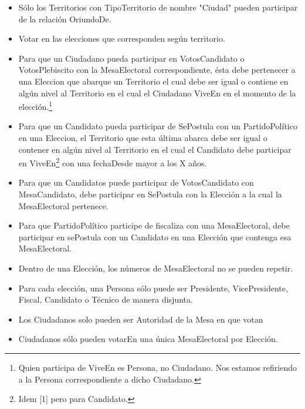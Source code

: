\begin{itemize}
\item{Sólo los Territorios con TipoTerritorio de nombre "Ciudad" pueden participar de la relación OriundoDe.}
\item{Votar en las elecciones que corresponden según territorio.}

\item{Para que un Ciudadano pueda participar en VotosCandidato o VotosPlebiscito con la MesaElectoral correspondiente, ésta debe pertenecer a una Eleccion que abarque un Territorio el cual debe ser igual o contiene en algún nivel al Territorio en el cual el Ciudadano ViveEn en el momento de la elección.\footnote{Quien participa de ViveEn es Persona, no Ciudadano. Nos estamos refiriendo a la Persona correspondiente a dicho Ciudadano.}
}


\item{Para que un Candidato pueda participar de SePostula con un PartidoPolítico en una Eleccion, el Territorio que esta última abarca debe ser igual o contener en algún nivel al Territorio en el cual el Candidato debe participar en ViveEn\footnote{Idem [1] pero para Candidato.} con una fechaDesde mayor a los X años.
}


\item{Para que un Candidatos puede participar de VotosCandidato con MesaCandidato, debe participar en SePostula con la Elección a la cual la MesaElectoral pertenece.
}


\item{Para que PartidoPolítico participe de fiscaliza con una MesaElectoral, debe participar en sePostula con un Candidato en una Elección que contenga esa MesaElectoral.}

\item{Dentro de una Elección, los números de MesaElectoral no se pueden repetir.}

\item{Para cada elección, una Persona sólo puede ser Presidente, VicePresidente, Fiscal, Candidato o Técnico de manera disjunta.}

\item{Los Ciudadanos solo pueden ser Autoridad de la Mesa en que votan}

\item{Ciudadanos sólo pueden votarEn una única MesaElectoral por Elección.}


\end{itemize}
